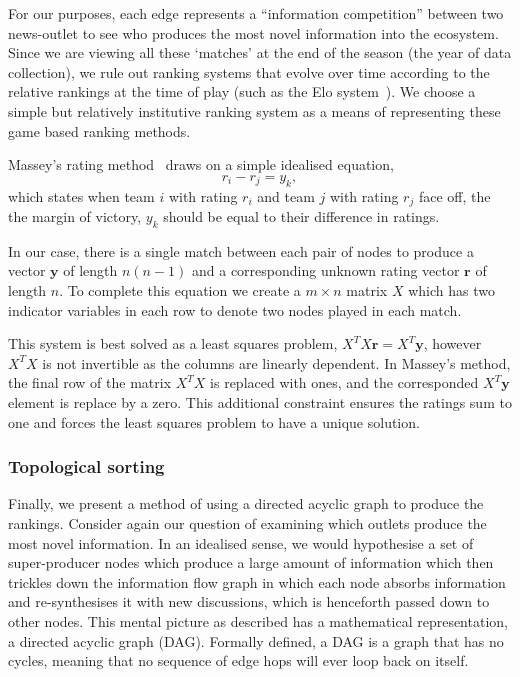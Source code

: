 For our purposes, each edge represents a ``information competition'' between two news-outlet to see who produces the most novel information into the ecosystem. Since we are viewing all these `matches' at the end of the season (the year of data collection), we rule out ranking systems that evolve over time according to the relative rankings at the time of play (such as the Elo system~\cite{elo_rating_1978}). We choose a simple but relatively institutive ranking system as a means of representing these game based ranking methods.


Massey's rating method~\cite{massey_statistical_1997,langville_whos_2012} draws on a simple idealised equation,
\begin{equation}
r_i- r_j=y_k,
\end{equation}
which states when team $i$ with rating $r_i$ and team $j$ with rating $r_j$ face off, the the margin of victory, $y_k$ should be equal to their difference in ratings.

In our case, there is a single match between each pair of nodes to produce a vector $\mathbf{y}$ of length  $n(n-1)$ and a corresponding unknown rating vector $\mathbf{r}$ of length $n$. To complete this equation we create a $m\times n$ matrix $X$ which has two indicator variables in each row to denote two nodes played in each match.

This system is best solved as a least squares problem, $X^TX\mathbf{r}=X^T\mathbf{y}$, however $X^TX$ is not invertible as the columns are linearly dependent. In Massey's method, the final row of the matrix $X^TX$ is replaced with ones, and the corresponded $X^T\mathbf{y}$ element is replace by a zero. This additional constraint ensures the ratings sum to one and forces the least squares problem to have a unique solution.

\subsubsection{Topological sorting}

Finally, we present a method of using a directed acyclic graph to produce the rankings. Consider again our question of examining which outlets produce the most novel information. In an idealised sense, we would hypothesise a set of super-producer nodes which produce a large amount of information which then trickles down the information flow graph in which each node absorbs information and re-synthesises it with new discussions, which is henceforth passed down to other nodes. This mental picture as described has a mathematical representation, a directed acyclic graph (DAG). Formally defined, a DAG is a graph that has no cycles, meaning that no sequence of edge hops will ever loop back on itself.

